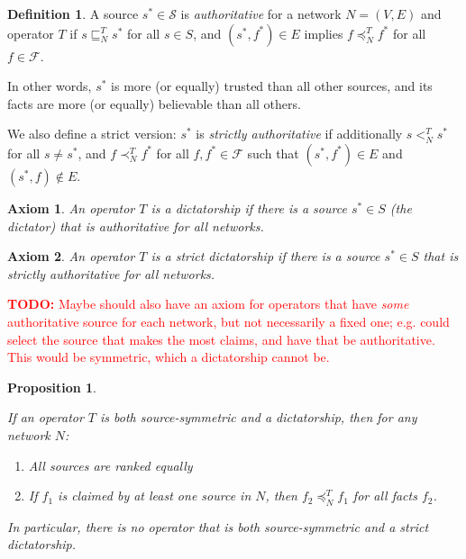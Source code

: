 \documentclass{article}
\theoremstyle{definition} \newtheorem{definition}{Definition}
\theoremstyle{definition} \newtheorem{example}{Example}
\theoremstyle{plain} \newtheorem{axiom}{Axiom}
\theoremstyle{plain} \newtheorem*{remark}{Remark}
\theoremstyle{remark} \newtheorem*{notation}{Notation}
\theoremstyle{plain} \newtheorem{lemma}{Lemma}
\theoremstyle{plain} \newtheorem{proposition}{Proposition}
\newcommand{\todo}[1] {
    \textcolor{red}{
        \textbf{TODO:} #1
    }
}
\renewcommand{\S}{\mathcal{S}}  %
\newcommand{\F}{\mathcal{F}}
\newcommand{\sle}{\sqsubseteq}
\newcommand{\slt}{<}
\newcommand{\fle}{\preceq}
\newcommand{\flt}{\prec}
\begin{document}
\begin{definition}

A source $s^* \in \S$ is \emph{authoritative} for a network $N=(V, E)$ and
operator $T$ if $s \sle_N^T s^*$ for all $s \in S$, and $(s^*, f^*) \in E$
implies $f \fle_N^T f^*$ for all $f \in \F$.

In other words, $s^*$ is more (or equally) trusted than all other sources, and
its facts are more (or equally) believable than all others.

We also define a strict version: $s^*$ is \emph{strictly authoritative} if
additionally $s \slt_N^T s^*$ for all $s \ne s^*$, and $f \flt_N^T f^*$ for all
$f, f^* \in \F$ such that $(s^*, f^*) \in E$ and $(s^*, f) \notin E$.

\end{definition}

\begin{axiom}
\label{axiom:dict}
An operator $T$ is a \emph{dictatorship} if there is a source $s^* \in S$ (the
dictator) that is authoritative for all networks.
\end{axiom}

\begin{axiom}
\label{axiom:strict_dict}
An operator $T$ is a \emph{strict dictatorship} if there is a source $s^* \in
S$ that is strictly authoritative for all networks.
\end{axiom}

\todo{
    Maybe should also have an axiom for operators that have \emph{some}
    authoritative source for each network, but not necessarily a fixed one;
    e.g. could select the source that makes the most claims, and have that be
    authoritative. This would be symmetric, which a dictatorship cannot be.
}

\begin{proposition}
\label{prop:symm_and_dict}

If an operator $T$ is both source-symmetric and a dictatorship, then for any
network $N$:
\begin{enumerate}
\item All sources are ranked equally
\item If $f_1$ is claimed by at least one source in $N$, then $f_2 \fle_N^T
f_1$ for all facts $f_2$.
\end{enumerate}

In particular, there is no operator that is both source-symmetric and a strict
dictatorship.
\end{proposition}
\end{document}
